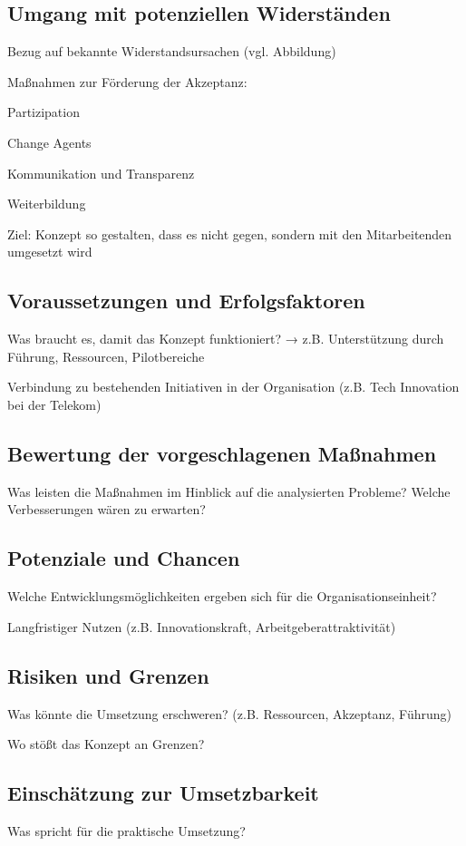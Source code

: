 \documentclass[12pt,a4paper]{article}
\begin{document}
		\subsection{Umgang mit potenziellen Widerständen}
	Bezug auf bekannte Widerstandsursachen (vgl. Abbildung)
	
	Maßnahmen zur Förderung der Akzeptanz:
	
	Partizipation
	
	Change Agents
	
	Kommunikation und Transparenz
	
	Weiterbildung
	
	Ziel: Konzept so gestalten, dass es nicht gegen, sondern mit den Mitarbeitenden umgesetzt wird
	
	\subsection{Voraussetzungen und Erfolgsfaktoren}
	Was braucht es, damit das Konzept funktioniert?
	→ z.B. Unterstützung durch Führung, Ressourcen, Pilotbereiche
	
	Verbindung zu bestehenden Initiativen in der Organisation (z.B. Tech  Innovation bei der Telekom)
	\subsection{Bewertung der vorgeschlagenen Maßnahmen}
	
	Was leisten die Maßnahmen im Hinblick auf die analysierten Probleme?
	Welche Verbesserungen wären zu erwarten?
	\subsection{Potenziale und Chancen}
	Welche Entwicklungsmöglichkeiten ergeben sich für die Organisationseinheit?
	
	Langfristiger Nutzen (z.B. Innovationskraft, Arbeitgeberattraktivität)
	\subsection{Risiken und Grenzen}
	Was könnte die Umsetzung erschweren? (z.B. Ressourcen, Akzeptanz, Führung)
	
	Wo stößt das Konzept an Grenzen?
	
	\subsection{Einschätzung zur Umsetzbarkeit}
	Was spricht für die praktische Umsetzung?
	
\end{document}
